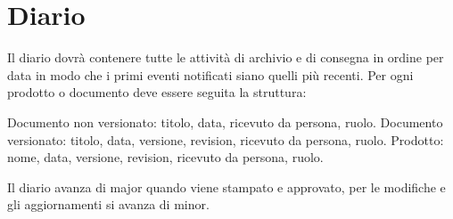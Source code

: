 \section{Diario}
Il diario dovrà contenere tutte le attività di archivio e di consegna in ordine per data in modo che i primi eventi notificati siano quelli più recenti.
Per ogni prodotto o documento deve essere seguita la struttura:

Documento non versionato: titolo, data, ricevuto da persona, ruolo. 
Documento versionato: titolo, data, versione, revision, ricevuto da persona, ruolo. 
Prodotto: nome, data, versione, revision, ricevuto da persona, ruolo.

Il diario avanza di major quando viene stampato e approvato, per le modifiche e gli aggiornamenti si avanza di minor.
